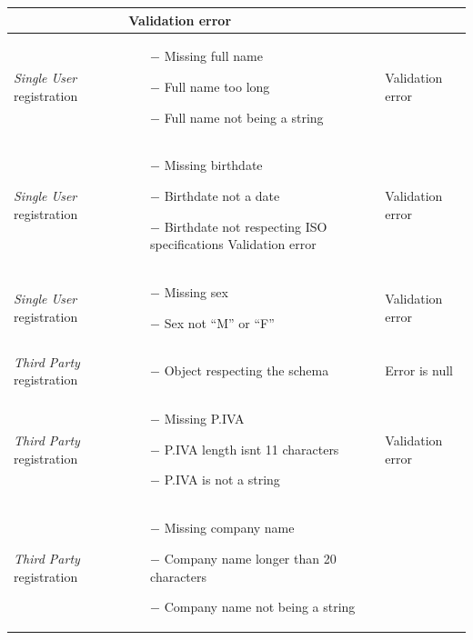 \documentclass[titlepage]{article}
\begin{document}
\begin{longtable}{| p{3 cm} | p{5 cm} | p{3 cm} |}
\begin{itemize}[nolistsep]
		\end{itemize}
		& Validation error \\ \hline
		{\it Single User} registration & \begin{itemize}[nolistsep]
			\item[$-$] Missing full name
			\item[$-$] Full name too long
			\item[$-$] Full name not being a string
		\end{itemize}
		& Validation error \\ \hline
		{\it Single User} registration & \begin{itemize}[nolistsep]
			\item[$-$] Missing birthdate
			\item[$-$] Birthdate not a date
			\item[$-$] Birthdate not respecting ISO specifications Validation error
		\end{itemize}
		& Validation error \\ \hline
		{\it Single User} registration & \begin{itemize}[nolistsep]
			\item[$-$] Missing sex
			\item[$-$] Sex not “M” or “F”
		\end{itemize}
		& Validation error \\ \hline
		{\it Third Party} registration & \begin{itemize}[nolistsep]
			\item[$-$] Object respecting the schema
		\end{itemize}
		& Error is null \\ \hline
		{\it Third Party} registration & \begin{itemize}[nolistsep]
			\item[$-$] Missing P.IVA
			\item[$-$] P.IVA length isn\textsc{\char13}t 11 characters
			\item[$-$] P.IVA is not a string
		\end{itemize}
		& Validation error \\ \hline
		{\it Third Party} registration & \begin{itemize}[nolistsep]
			\item[$-$] Missing company name
			\item[$-$] Company name longer than 20 characters
			\item[$-$] Company name not being a string
		\end{itemize}

\end{longtable}
\end{document}
